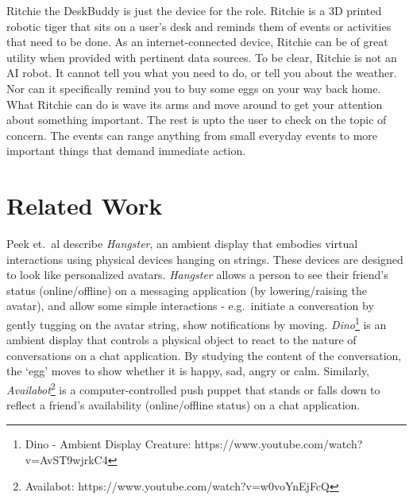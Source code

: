 \documentclass{sigchi-ext}
\begin{document}
Ritchie the DeskBuddy is just the device for the role. Ritchie is a 3D printed
robotic tiger that sits on a user's desk and reminds them of events or
activities that need to be done. As an internet-connected device, Ritchie can
be of great utility when provided with pertinent data sources. To be clear,
Ritchie is not an AI robot. It cannot tell you what you need to do, or tell you
about the weather. Nor can it specifically remind you to buy some eggs on your
way back home. What Ritchie can do is wave its arms and move around to get your
attention about something important. The rest is upto the user to check on the
topic of concern. The events can range anything from small everyday events to
more important things that demand immediate action.

\section{Related Work}

Peek et.\ al \cite{peek2009hangsters} describe \textit{Hangster}, an ambient
display that embodies virtual interactions using physical devices hanging on
strings. These devices are designed to look like personalized avatars.
\textit{Hangster} allows a person to see their friend's status (online/offline)
on a messaging application (by lowering/raising the avatar), and allow some
simple interactions - e.g.\ initiate a conversation by gently tugging on the
avatar string, show notifications by moving. \textit{Dino}\footnote{Dino -
Ambient Display Creature: https://www.youtube.com/watch?v=AvST9wjrkC4} is an
ambient display that controls a physical object to react to the nature of
conversations on a chat application. By studying the content of the
conversation, the `egg' moves to show whether it is happy, sad, angry or calm.
Similarly, \textit{Availabot}\footnote{Availabot:
https://www.youtube.com/watch?v=w0voYnEjFcQ} is a computer-controlled push
puppet that stands or falls down to reflect a friend's availability
(online/offline status) on a chat application.
\end{document}
